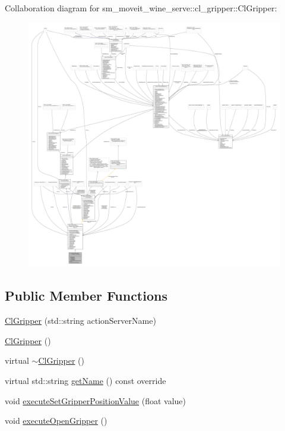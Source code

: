 Collaboration diagram for sm\+\_\+moveit\+\_\+wine\+\_\+serve\+:\+:cl\+\_\+gripper\+:\+:Cl\+Gripper\+:
\nopagebreak
\begin{figure}[H]
\begin{center}
\leavevmode
\includegraphics[width=350pt]{classsm__moveit__wine__serve_1_1cl__gripper_1_1ClGripper__coll__graph}
\end{center}
\end{figure}
\subsection*{Public Member Functions}
\begin{DoxyCompactItemize}
\item 
\hyperlink{classsm__moveit__wine__serve_1_1cl__gripper_1_1ClGripper_a339d1fd87ff609bf1f9be6c2056b5775}{Cl\+Gripper} (std\+::string action\+Server\+Name)
\item 
\hyperlink{classsm__moveit__wine__serve_1_1cl__gripper_1_1ClGripper_a5875b10c0b24f9af5d33a16f53d302d5}{Cl\+Gripper} ()
\item 
virtual \hyperlink{classsm__moveit__wine__serve_1_1cl__gripper_1_1ClGripper_a9cdc095f66dc7bc34ab8a5b5796285f5}{$\sim$\+Cl\+Gripper} ()
\item 
virtual std\+::string \hyperlink{classsm__moveit__wine__serve_1_1cl__gripper_1_1ClGripper_a1c566c9ae76fcd58b35f1831b0eceabe}{get\+Name} () const override
\item 
void \hyperlink{classsm__moveit__wine__serve_1_1cl__gripper_1_1ClGripper_a7b273911dfd5385b3e416a867fe46c24}{execute\+Set\+Gripper\+Position\+Value} (float value)
\item 
void \hyperlink{classsm__moveit__wine__serve_1_1cl__gripper_1_1ClGripper_a83567ed4b618c1bb3b05c4cf43b30ec4}{execute\+Open\+Gripper} ()
\end{DoxyCompactItemize}
